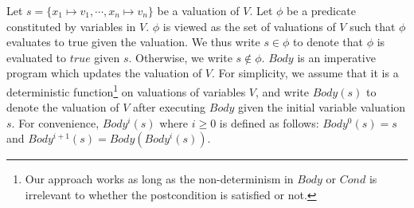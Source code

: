 Let $s = \{ x_1 \mapsto v_1, \cdots, x_n \mapsto v_n \}$ be a valuation of $V$. Let $\phi$ be a predicate constituted by variables in $V$. $\phi$ is viewed as the set of valuations of $V$ such that $\phi$ evaluates to true given the valuation. We thus write $s \in \phi$ to denote that $\phi$ is evaluated to $true$ given $s$. Otherwise, we write $s \not \in \phi$.
$Body$ is an imperative program which updates the valuation of $V$. For simplicity, we assume that it is a deterministic function\footnote{Our approach works as long as the non-determinism in $Body$ or $Cond$ is irrelevant to whether the postcondition is satisfied or not.} on valuations of variables $V$, and write $Body(s)$ to denote the valuation of $V$ after executing $Body$ given the initial variable valuation $s$. For convenience, $Body^i(s)$ where $i \geq 0$ is defined as follows: $Body^0(s) = s$ and $Body^{i+1}(s) = Body(Body^i(s))$.

